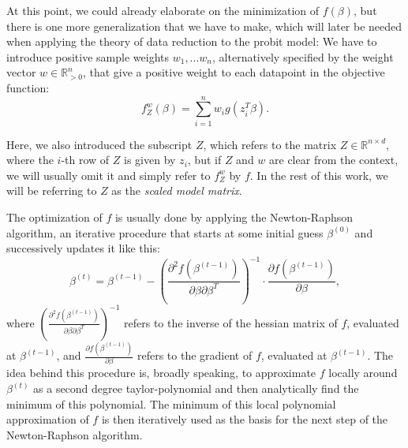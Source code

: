 At this point, we could already elaborate on the
minimization of $f(\beta)$, but there is one more
generalization that we have to make, which will
later be needed when applying the theory of data
reduction to the probit model: We have to
introduce positive sample weights $w_1, ... w_n$,
alternatively specified by the weight vector
$w \in \mathbb{R}_{>0}^n$, that give a positive
weight to each datapoint in the objective function:
\begin{equation}
    \label{eq:weighted-objective-function}
    f_Z^w(\beta) = \sum_{i=1}^n w_i g(z_i^T \beta).
\end{equation}

\noindent Here, we also introduced the subscript $Z$,
which refers to the matrix $Z \in \mathbb{R}^{n \times d}$,
where the $i$-th row of $Z$ is given by $z_i$,
but if $Z$ and $w$ are clear from the
context, we will usually omit it and simply refer to
$f_Z^w$ by $f$. In the rest of this work, we will be
referring to $Z$ as the \textit{scaled model matrix}.

The optimization of $f$ is usually done by applying the
Newton-Raphson algorithm, an iterative procedure that
starts at some initial guess $\beta^{(0)}$ and successively
updates it like this:
\begin{equation}
    \beta^{(t)} = \beta^{(t-1)} - \left(\frac{\partial^2f(\beta^{(t-1)})}{\partial\beta\partial\beta^T}\right)^{-1}
    \cdot \frac{\partial f(\beta^{(t-1)})}{\partial\beta},
\end{equation}
where $\left(\frac{\partial^2f(\beta^{(t-1)})}{\partial\beta\partial\beta^T}\right)^{-1}$
refers to the inverse of the hessian matrix of $f$, evaluated at
$\beta^{(t-1)}$, and $\frac{\partial f(\beta^{(t-1)})}{\partial\beta}$
refers to the gradient of $f$, evaluated at $\beta^{(t-1)}$.
The idea behind this procedure is, broadly speaking, to approximate
$f$ locally around $\beta^{(t)}$ as a second degree taylor-polynomial and then
analytically find the minimum of this polynomial. The minimum of this
local polynomial approximation of $f$ is then
iteratively used as the basis for the next step of the
Newton-Raphson algorithm.

